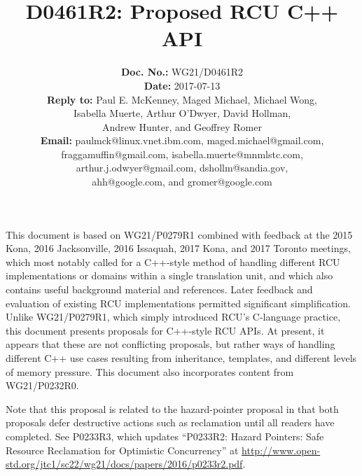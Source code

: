 \documentclass[letterpaper,10pt]{article}
\begin{document}
\newcommand{\co}[1]{\lstinline[breaklines=yes,breakatwhitespace=yes]{#1}}

\title{D0461R2: Proposed RCU C++ API}

\author{
{\bf Doc. No.: } WG21/D0461R2 \\
{\bf Date: } 2017-07-13 \\
{\bf Reply to: } Paul E. McKenney, Maged Michael, Michael Wong,\\
Isabella Muerte, Arthur O'Dwyer, David Hollman, \\
Andrew Hunter, and Geoffrey Romer \\
{\bf Email: } paulmck@linux.vnet.ibm.com, maged.michael@gmail.com, \\
fraggamuffin@gmail.com, isabella.muerte@mnmlstc.com, \\
arthur.j.odwyer@gmail.com, dshollm@sandia.gov, \\
ahh@google.com, and gromer@google.com
} %


\pagestyle{myheadings}

\maketitle


This document is based on WG21/P0279R1 combined with feedback at
the 2015 Kona, 2016 Jacksonville, 2016 Issaquah, 2017 Kona, and
2017 Toronto meetings, which most notably called
for a C++-style method of handling different RCU implementations or
domains within a single translation unit, and which also contains
useful background material and references.
Later feedback and evaluation of existing RCU implementations permitted
significant simplification.
Unlike WG21/P0279R1, which simply introduced RCU's C-language practice,
this document presents proposals for C++-style RCU APIs.
At present, it appears that these are not conflicting proposals, but
rather ways of handling different C++ use cases resulting from
inheritance, templates, and different levels of memory pressure.
This document also incorporates content from
WG21/P0232R0\cite{PaulEMcKennneyToolKitP0232R0}.

Note that this proposal is related to the hazard-pointer proposal in
that both proposals defer destructive actions such as reclamation until
all readers have completed.
See P0233R3, which updates ``P0233R2: Hazard Pointers:
Safe Resource Reclamation for Optimistic Concurrency''
at \url{http://www.open-std.org/jtc1/sc22/wg21/docs/papers/2016/p0233r2.pdf}.
\end{document}
